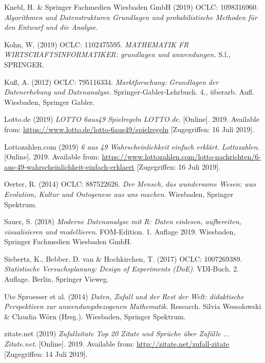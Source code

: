 \documentclass[ngerman,]{article}
\begin{document}
\hypertarget{ref-knebl_algorithmen_2019}{}
Knebl, H. \& Springer Fachmedien Wiesbaden GmbH (2019) OCLC: 1098316960.
\emph{Algorithmen und Datenstrukturen Grundlagen und probabilistische
Methoden für den Entwurf und die Analyse}.

\hypertarget{ref-kohn_mathematik_2019}{}
Kohn, W. (2019) OCLC: 1102475595. \emph{MATHEMATIK FR
WIRTSCHAFTSINFORMATIKER: grundlagen und anwendungen.} S.l., SPRINGER.

\hypertarget{ref-kus_marktforschung:_2012}{}
Kuß, A. (2012) OCLC: 795116334. \emph{Marktforschung: Grundlagen der
Datenerhebung und Datenanalyse}. Springer-Gabler-Lehrbuch. 4., überarb.
Aufl. Wiesbaden, Springer Gabler.

\hypertarget{ref-lotto.de_lotto_2019}{}
Lotto.de (2019) \emph{LOTTO 6aus49 Spielregeln LOTTO.de}. {[}Online{]}.
2019. Available from:
\url{https://www.lotto.de/lotto-6aus49/spielregeln} {[}Zugegriffen: 16
Juli 2019{]}.

\hypertarget{ref-lottozahlen.com_6_2019}{}
Lottozahlen.com (2019) \emph{6 aus 49 Wahrscheinlichkeit einfach
erklärt. Lottozahlen}. {[}Online{]}. 2019. Available from:
\url{https://www.lottozahlen.com/lotto-nachrichten/6-aus-49-wahrscheinlichkeit-einfach-erklaert}
{[}Zugegriffen: 16 Juli 2019{]}.

\hypertarget{ref-oerter_mensch_2014}{}
Oerter, R. (2014) OCLC: 887522626. \emph{Der Mensch, das wundersame
Wesen: was Evolution, Kultur und Ontogenese aus uns machen}. Wiesbaden,
Springer Spektrum.

\hypertarget{ref-sauer_moderne_2018}{}
Sauer, S. (2018) \emph{Moderne Datenanalyse mit R: Daten einlesen,
aufbereiten, visualisieren und modellieren}. FOM-Edition. 1. Auflage
2019. Wiesbaden, Springer Fachmedien Wiesbaden GmbH.

\hypertarget{ref-siebertz_statistische_2017}{}
Siebertz, K., Bebber, D. van \& Hochkirchen, T. (2017) OCLC: 1007269389.
\emph{Statistische Versuchsplanung: Design of Experiments (DoE)}.
VDI-Buch. 2. Auflage. Berlin, Springer Vieweg.

\hypertarget{ref-ute_sproesser_et_al._daten_2014}{}
Ute Sproesser et al. (2014) \emph{Daten, Zufall und der Rest der Welt:
didaktische Perspektiven zur anwendungsbezogenen Mathematik}. Research.
Silvia Wessolowski \& Claudia Wörn (Hrsg.). Wiesbaden, Springer
Spektrum.

\hypertarget{ref-zitate.net_zufallzitate_2019}{}
zitate.net (2019) \emph{Zufallzitate Top 20 Zitate und Sprüche über
Zufälle ... Zitate.net}. {[}Online{]}. 2019. Available from:
\url{http://zitate.net/zufall-zitate} {[}Zugegriffen: 14 Juli 2019{]}.
\end{document}
